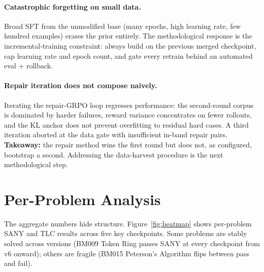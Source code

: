 \documentclass[11pt]{article}
\begin{document}
\paragraph{Catastrophic forgetting on small data.} Broad SFT from
the unmodified base (many epochs, high learning rate, few hundred
examples) erases the prior entirely. The methodological response is
the incremental-training constraint: always build on the previous
merged checkpoint, cap learning rate and epoch count, and gate
every retrain behind an automated eval + rollback.

\paragraph{Repair iteration does not compose naively.} Iterating
the repair-GRPO loop regresses performance: the second-round
corpus is dominated by harder failures, reward variance
concentrates on fewer rollouts, and the KL anchor does not prevent
overfitting to residual hard cases. A third iteration aborted at
the data gate with insufficient in-band repair pairs.
\textbf{Takeaway:} the repair method wins the first round but does
not, as configured, bootstrap a second. Addressing the data-harvest
procedure is the next methodological step.

\section{Per-Problem Analysis}
\label{sec:per-problem}

The aggregate numbers hide structure.  Figure~\ref{fig:heatmap}
shows per-problem SANY and TLC results across five key checkpoints.
Some problems are stably solved across versions (BM009 Token Ring
passes SANY at every checkpoint from v6 onward); others are fragile
(BM015 Peterson's Algorithm flips between pass and fail).
\end{document}
